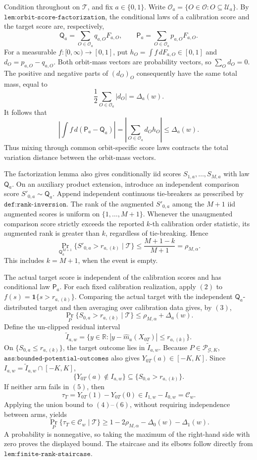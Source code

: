 Condition throughout on \(\mathcal T\), and fix \(a\in\{0,1\}\). Write \(\mathcal O_a=\{O\in\mathcal O:O\subseteq\mathcal U_a\}\). By \(\texttt{lem:orbit-score-factorization}\), the conditional laws of a calibration score and the target score are, respectively,
\[
\mathsf Q_a=\sum_{O\in\mathcal O_a}q_{a,O}F_{a,O},\qquad \mathsf P_a=\sum_{O\in\mathcal O_a}p_{a,O}F_{a,O}.
\tag{1}
\]
For a measurable \(f:[0,\infty)\to[0,1]\), put \(h_O=\int f\,dF_{a,O}\in[0,1]\) and \(d_O=p_{a,O}-q_{a,O}\). Both orbit-mass vectors are probability vectors, so \(\sum_Od_O=0\). The positive and negative parts of \((d_O)_O\) consequently have the same total mass, equal to
\[
\frac12\sum_{O\in\mathcal O_a}|d_O|=\Delta_a(w).
\]
It follows that
\[
\left|\int f\,d(\mathsf P_a-\mathsf Q_a)\right|=\left|\sum_{O\in\mathcal O_a}d_Oh_O\right|\le\Delta_a(w).
\tag{2}
\]
Thus mixing through common orbit-specific score laws contracts the total variation distance between the orbit-mass vectors.

The factorization lemma also gives conditionally iid scores \(S_{1,a},\ldots,S_{M,a}\) with law \(\mathsf Q_a\). On an auxiliary product extension, introduce an independent comparison score \(S'_{0,a}\sim\mathsf Q_a\). Append independent continuous tie-breakers as prescribed by \(\texttt{def:rank-inversion}\). The rank of the augmented \(S'_{0,a}\) among the \(M+1\) iid augmented scores is uniform on \(\{1,\ldots,M+1\}\). Whenever the unaugmented comparison score strictly exceeds the reported \(k\)-th calibration order statistic, its augmented rank is greater than \(k\), regardless of tie-breaking. Hence
\[
\Pr_{\mathsf Q_a^{M+1}}\{S'_{0,a}>r_{a,(k)}\mid\mathcal T\}\le\frac{M+1-k}{M+1}=\rho_{M,\alpha}.
\tag{3}
\]
This includes \(k=M+1\), when the event is empty.

The actual target score is independent of the calibration scores and has conditional law \(\mathsf P_a\). For each fixed calibration realization, apply \((2)\) to \(f(s)=\mathbf 1\{s>r_{a,(k)}\}\). Comparing the actual target with the independent \(\mathsf Q_a\)-distributed target and then averaging over calibration data gives, by \((3)\),
\[
\Pr_P\{S_{0,a}>r_{a,(k)}\mid\mathcal T\}\le\rho_{M,\alpha}+\Delta_a(w).
\tag{4}
\]
Define the un-clipped residual interval
\[
\widetilde I_{a,w}=\{y\in\mathbb R:|y-\widehat m_a(X_{0T})|\le r_{a,(k)}\}.
\]
On \(\{S_{0,a}\le r_{a,(k)}\}\), the target outcome lies in \(\widetilde I_{a,w}\). Because \(P\in\mathcal P_{\mathcal G,K}\), \(\texttt{ass:bounded-potential-outcomes}\) also gives \(Y_{0T}(a)\in[-K,K]\). Since \(I_{a,w}=\widetilde I_{a,w}\cap[-K,K]\),
\[
\{Y_{0T}(a)\notin I_{a,w}\}\subseteq\{S_{0,a}>r_{a,(k)}\}.
\tag{5}
\]
If neither arm fails in \((5)\), then
\[
\tau_T=Y_{0T}(1)-Y_{0T}(0)\in I_{1,w}-I_{0,w}=\mathcal C_w.
\tag{6}
\]
Applying the union bound to \((4)\)--\((6)\), without requiring independence between arms, yields
\[
\Pr_P\{\tau_T\in\mathcal C_w\mid\mathcal T\}\ge1-2\rho_{M,\alpha}-\Delta_0(w)-\Delta_1(w).
\]
A probability is nonnegative, so taking the maximum of the right-hand side with zero proves the displayed bound. The staircase and its elbows follow directly from \(\texttt{lem:finite-rank-staircase}\).

